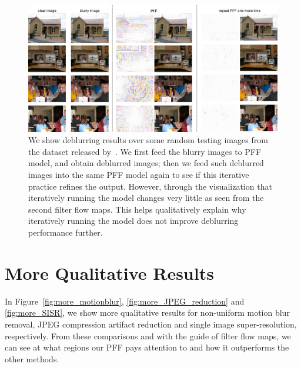 \begin{figure}[t]
    \centering
    \begin{minipage}{0.95\textwidth}
        \centering
        \includegraphics[width=1\linewidth]{iterativeRefine.png}
    \end{minipage}
    \caption{
    We show deblurring results over some random  testing images from the dataset released by~\cite{bahat2017non}.
    We first feed the blurry images to PFF model, and obtain deblurred images;
    then we feed such deblurred images into the same PFF model again to see if this iterative practice refines
    the output.
    However,
    through the visualization that iteratively running the model changes very little as seen
    from the second filter flow maps.
    This helps qualitatively explain why iteratively running the model does not improve deblurring performance
    further.
    }
    \label{fig:iterativeRefine}
\end{figure}



\section{More Qualitative Results}

In Figure~\ref{fig:more_motionblur}, \ref{fig:more_JPEG_reduction} and \ref{fig:more_SISR},
we show more qualitative results for
non-uniform motion blur removal,
JPEG compression artifact reduction
and single image super-resolution, respectively.
From these comparisons and with the guide of filter flow maps,
we can see at what regions our PFF pays attention to and how it outperforms
the other methods.




